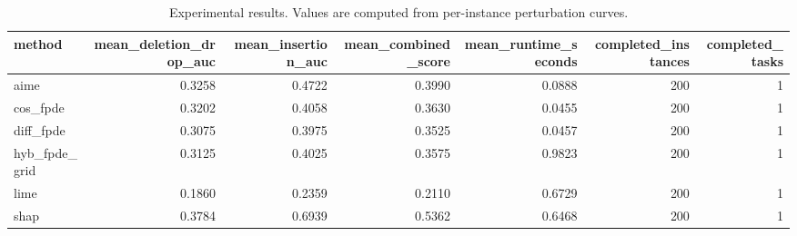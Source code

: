 \begin{table}[t]
\caption{Experimental results. Values are computed from per-instance perturbation curves.}
\label{tab:main_results_computed}
\centering
\begin{tabular}{lrrrrrr}
\toprule
method & mean\_deletion\_drop\_auc & mean\_insertion\_auc & mean\_combined\_score & mean\_runtime\_seconds & completed\_instances & completed\_tasks \\
\midrule
aime & 0.3258 & 0.4722 & 0.3990 & 0.0888 & 200 & 1 \\
cos\_fpde & 0.3202 & 0.4058 & 0.3630 & 0.0455 & 200 & 1 \\
diff\_fpde & 0.3075 & 0.3975 & 0.3525 & 0.0457 & 200 & 1 \\
hyb\_fpde\_grid & 0.3125 & 0.4025 & 0.3575 & 0.9823 & 200 & 1 \\
lime & 0.1860 & 0.2359 & 0.2110 & 0.6729 & 200 & 1 \\
shap & 0.3784 & 0.6939 & 0.5362 & 0.6468 & 200 & 1 \\
\bottomrule
\end{tabular}

\end{table}
